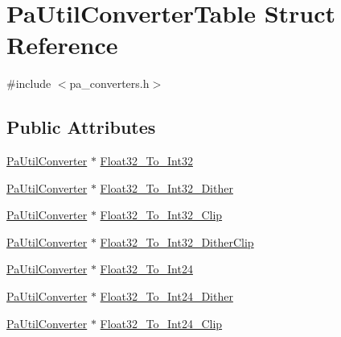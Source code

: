 \hypertarget{struct_pa_util_converter_table}{}\section{Pa\+Util\+Converter\+Table Struct Reference}
\label{struct_pa_util_converter_table}


{\ttfamily \#include $<$pa\+\_\+converters.\+h$>$}

\subsection*{Public Attributes}
\begin{DoxyCompactItemize}
\item 
\hyperlink{pa__converters_8h_a4f65f7c2e9e185e7f8caebe85ae9575c}{Pa\+Util\+Converter} $\ast$ \hyperlink{struct_pa_util_converter_table_a64701b747f08157a7e51eb167c2984bf}{Float32\+\_\+\+To\+\_\+\+Int32}
\item 
\hyperlink{pa__converters_8h_a4f65f7c2e9e185e7f8caebe85ae9575c}{Pa\+Util\+Converter} $\ast$ \hyperlink{struct_pa_util_converter_table_a6ce00388d960201d8bcdf1e0fe04c1e7}{Float32\+\_\+\+To\+\_\+\+Int32\+\_\+\+Dither}
\item 
\hyperlink{pa__converters_8h_a4f65f7c2e9e185e7f8caebe85ae9575c}{Pa\+Util\+Converter} $\ast$ \hyperlink{struct_pa_util_converter_table_a8fc5021de2523d81f2b4e01b0cf3bb87}{Float32\+\_\+\+To\+\_\+\+Int32\+\_\+\+Clip}
\item 
\hyperlink{pa__converters_8h_a4f65f7c2e9e185e7f8caebe85ae9575c}{Pa\+Util\+Converter} $\ast$ \hyperlink{struct_pa_util_converter_table_a2e77a1a47e4018a4494197f95a7292b2}{Float32\+\_\+\+To\+\_\+\+Int32\+\_\+\+Dither\+Clip}
\item 
\hyperlink{pa__converters_8h_a4f65f7c2e9e185e7f8caebe85ae9575c}{Pa\+Util\+Converter} $\ast$ \hyperlink{struct_pa_util_converter_table_a1d8ec1d1317b8bee63c1528282046394}{Float32\+\_\+\+To\+\_\+\+Int24}
\item 
\hyperlink{pa__converters_8h_a4f65f7c2e9e185e7f8caebe85ae9575c}{Pa\+Util\+Converter} $\ast$ \hyperlink{struct_pa_util_converter_table_a0997447841c29b23d35da7c0623dc73d}{Float32\+\_\+\+To\+\_\+\+Int24\+\_\+\+Dither}
\item 
\hyperlink{pa__converters_8h_a4f65f7c2e9e185e7f8caebe85ae9575c}{Pa\+Util\+Converter} $\ast$ \hyperlink{struct_pa_util_converter_table_a291efd6facea4de4d4f13d6dfefcf7ca}{Float32\+\_\+\+To\+\_\+\+Int24\+\_\+\+Clip}
\item 

\end{DoxyCompactItemize}
